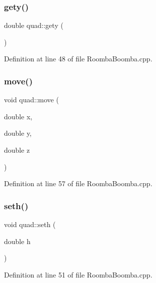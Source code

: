 \mbox{\label{classquad_a53d73fa22582ae9281e25eab543af569}} 
\subsubsection{\texorpdfstring{gety()}{gety()}}
{\footnotesize\ttfamily double quad\+::gety (\begin{DoxyParamCaption}{ }\end{DoxyParamCaption})\hspace{0.3cm}{\ttfamily [inline]}}



Definition at line 48 of file Roomba\+Boomba.\+cpp.

\mbox{\label{classquad_a34d9f5dcbbd3991048401e1cbe9a5441}} 
\subsubsection{\texorpdfstring{move()}{move()}}
{\footnotesize\ttfamily void quad\+::move (\begin{DoxyParamCaption}\item[{double}]{x,  }\item[{double}]{y,  }\item[{double}]{z }\end{DoxyParamCaption})\hspace{0.3cm}{\ttfamily [inline]}}



Definition at line 57 of file Roomba\+Boomba.\+cpp.

\mbox{\label{classquad_a798e28ed635bb3f4218067133a730123}} 
\subsubsection{\texorpdfstring{seth()}{seth()}}
{\footnotesize\ttfamily void quad\+::seth (\begin{DoxyParamCaption}\item[{double}]{h }\end{DoxyParamCaption})\hspace{0.3cm}{\ttfamily [inline]}}



Definition at line 51 of file Roomba\+Boomba.\+cpp.

